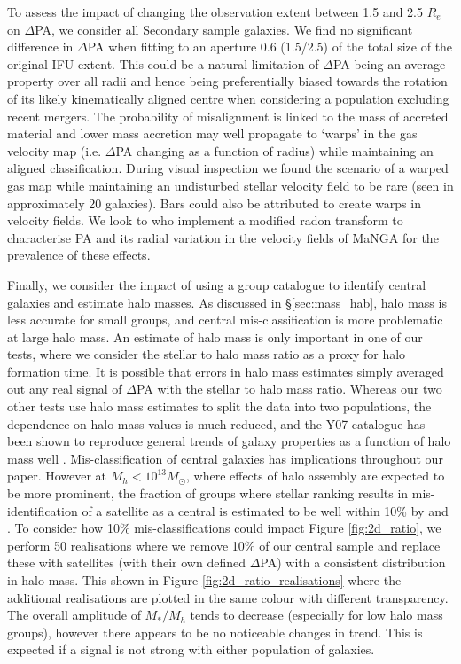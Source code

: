To assess the impact of changing the observation extent between 1.5 and 2.5 $R_e$ on $\Delta$PA, we consider all Secondary sample galaxies. We find no significant difference in $\Delta$PA when fitting to an aperture 0.6 (1.5/2.5) of the total size of the original IFU extent. This could be a natural limitation of $\Delta$PA being an average property over all radii and hence being preferentially biased towards the rotation of its likely kinematically aligned centre when considering a population excluding recent mergers. The probability of misalignment is linked to the mass of accreted material and lower mass accretion may well propagate to `warps' in the gas velocity map (i.e. $\Delta$PA changing as a function of radius) while maintaining an aligned classification. During visual inspection we found the scenario of a warped gas map while maintaining an undisturbed stellar velocity field to be rare (seen in approximately 20 galaxies). Bars could also be attributed to create warps in velocity fields.  We look to \citet{stark2018} who implement a modified radon transform to characterise PA and its radial variation in the velocity fields of MaNGA for the prevalence of these effects.

Finally, we consider the impact of using a group catalogue to identify central galaxies and estimate halo masses. As discussed in \S\ref{sec:mass_hab}, halo mass is less accurate for small groups, and central mis-classification is more problematic at large halo mass. An estimate of halo mass is only important in one of our tests, where we consider the stellar to halo mass ratio as a proxy for halo formation time. It is possible that errors in halo mass estimates simply averaged out any real signal of $\Delta$PA with the stellar to halo mass ratio. Whereas our two other tests use halo mass estimates to split the data into two populations, the dependence on halo mass values is much reduced, and the Y07 catalogue has been shown to reproduce general trends of galaxy properties as a function of halo mass well \citep{campbell2015}. 
Mis-classification of central galaxies has implications throughout our paper. However at $M_h < 10^{13} M_{\odot}$, where effects of halo assembly are expected to be more prominent, the fraction of groups where stellar ranking results in mis-identification of a satellite as a central is estimated to be well within 10\% by \cite{campbell2015} and \cite{reddick2013}. To consider how 10\% mis-classifications could impact Figure \ref{fig:2d_ratio}, we perform 50 realisations where we remove 10\% of our central sample and replace these with satellites (with their own defined $\Delta$PA) with a consistent distribution in halo mass. This shown in Figure \ref{fig:2d_ratio_realisations} where the additional realisations are plotted in the same colour with different transparency. The overall amplitude of $M_{\ast}/M_{h}$ tends to decrease (especially for low halo mass groups), however there appears to be no noticeable changes in trend. This is expected if a signal is not strong with either population of galaxies.

